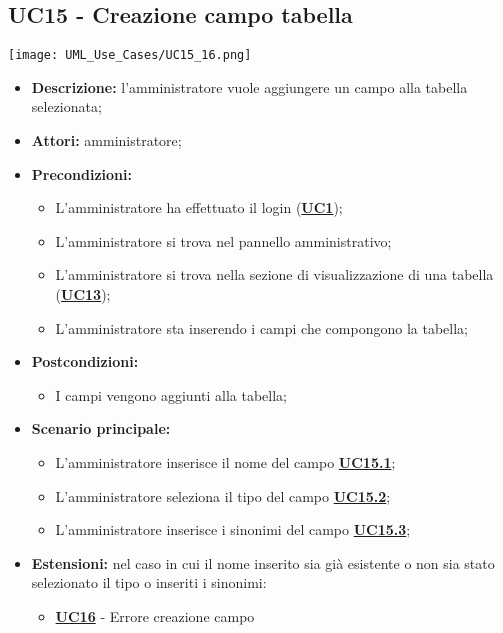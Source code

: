 \subsection{UC15 - Creazione campo tabella}
\label{sec:UC15}
\texttt{[image: UML\_Use\_Cases/UC15\_16.png]}
\begin{itemize}
	\item \textbf{Descrizione:} l’amministratore vuole aggiungere un campo alla tabella selezionata;
	\item \textbf{Attori:} amministratore;
	\item \textbf{Precondizioni:} 
	\begin{itemize}
		\item L’amministratore ha effettuato il login (\hyperref[sec:UC1]{\textbf{UC1}});
		\item L’amministratore si trova nel pannello amministrativo;
		\item L’amministratore si trova nella sezione di visualizzazione di una tabella (\hyperref[sec:UC13]{\textbf{UC13}});
		\item L’amministratore sta inserendo i campi che compongono la tabella;
	\end{itemize}
	\item \textbf{Postcondizioni:} 
	\begin{itemize}
		\item I campi vengono aggiunti alla tabella;
	\end{itemize}
	\item \textbf{Scenario principale:} 
	\begin{itemize}
		\item L’amministratore inserisce il nome del campo \hyperref[sec:UC15.1]{\textbf{UC15.1}};
		\item L'amministratore seleziona il tipo del campo \hyperref[sec:UC15.2]{\textbf{UC15.2}};
		\item L'amministratore inserisce i sinonimi del campo \hyperref[sec:UC15.3]{\textbf{UC15.3}};
	\end{itemize}
	\item \textbf{Estensioni:} nel caso in cui il nome inserito sia già esistente o non sia stato selezionato il tipo o inseriti i sinonimi:
	\begin{itemize}
		\item \hyperref[sec:UC16]{\textbf{UC16}} - Errore creazione campo
	\end{itemize}
\end{itemize}

